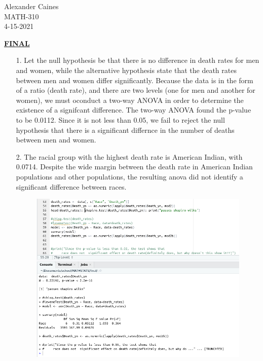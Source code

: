 \documentclass[12pt]{article}
\begin{document}
\vspace{1.0 \baselineskip}

\begin{flushright}
	Alexander Caines\\
	MATH-310\\
	4-15-2021\\
\end{flushright}

\begin{center}
	\textbf{\underline{FINAL}}
\end{center}



\begin{enumerate}
	\item[1.] Let the null hypothesis be that there is no difference in death rates for men and women, 
		while the alternative hypothesis state that the death rates between men and women differ significantly. 
		Because the data is in the form of a ratio (death rate), and there are two levels (one for men and another for women), 
		we must oconduct a two-way ANOVA in order to determine the existence of a signifcant difference. 
		The two-way ANOVA found the p-value to be 0.0112. Since it is not less than 0.05, we fail to reject
		 the null hypothesis that there is a significant differnce in the number of deaths between men and women. 
	\item[2.] The racial group with the highest death rate is American Indian, with 0.0714. Despite the wide margin 
		between the death rate in American Indian populations and other populations, the resulting anova did not 
	identify a significant difference between races.
	\begin{figure}[!h]
		\centering
		\includegraphics[width=\linewidth]{p2-m.png}

\end{figure}
\end{enumerate}
\end{document}
